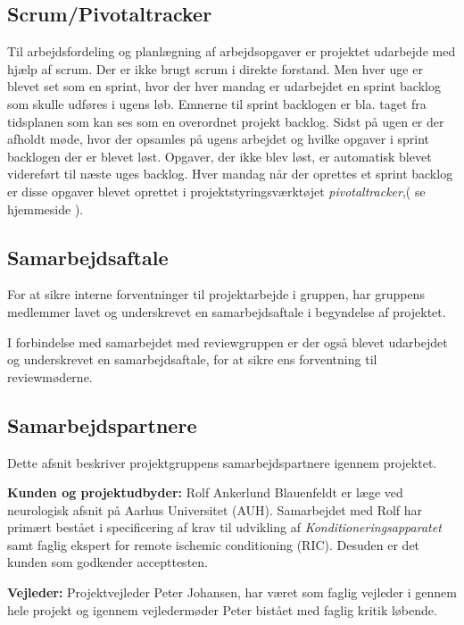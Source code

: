 \subsection{Scrum/Pivotaltracker} \label{title:scrum}
Til arbejdsfordeling og planlægning af arbejdsopgaver er projektet udarbejde med hjælp af scrum. Der er ikke brugt scrum i direkte forstand. Men hver uge er blevet set som en sprint, hvor der hver mandag er udarbejdet en sprint backlog som skulle udføres i ugens løb. Emnerne til sprint backlogen er bla. taget fra tidsplanen som kan ses som en overordnet projekt backlog. Sidst på ugen er der afholdt møde, hvor der opsamles på ugens arbejdet og hvilke opgaver i sprint backlogen der er blevet løst. Opgaver, der ikke blev løst, er automatisk blevet videreført til næste uges backlog. Hver mandag når der oprettes et sprint backlog er disse opgaver blevet oprettet i projektstyringsværktøjet \textit{pivotaltracker},( se hjemmeside ). 

\subsection{Samarbejdsaftale}
For at sikre interne forventninger til projektarbejde i gruppen, har gruppens medlemmer lavet og underskrevet en samarbejdsaftale i begyndelse af projektet. 

I forbindelse med samarbejdet med reviewgruppen er der også blevet udarbejdet og underskrevet en samarbejdsaftale, for at sikre ens forventning til reviewmøderne. 

\subsection{Samarbejdspartnere} \label{title:samarbejdspartnere}
Dette afsnit beskriver projektgruppens samarbejdspartnere igennem projektet. 

\textbf{Kunden og projektudbyder:} Rolf Ankerlund Blauenfeldt er læge ved neurologisk afsnit på Aarhus Universitet (AUH). Samarbejdet med Rolf har primært bestået i specificering af krav til udvikling af \textit{Konditioneringsapparatet} samt faglig ekspert for remote ischemic conditioning (RIC). Desuden er det kunden som godkender accepttesten.

\textbf{Vejleder:} Projektvejleder Peter Johansen, har været som faglig vejleder i gennem hele projekt og igennem vejledermøder Peter bistået med faglig kritik løbende. 

